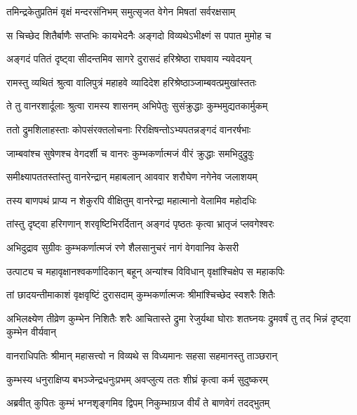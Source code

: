 \twolineshloka
{तमिन्द्रकेतुप्रतिमं वृक्षं मन्दरसंनिभम्}
{समुत्सृजत वेगेन मिषतां सर्वरक्षसाम्} %

\twolineshloka
{स चिच्छेद शितैर्बाणैः सप्तभिः कायभेदनैः}
{अङ्गदो विव्यथेऽभीक्ष्णं स पपात मुमोह च} %

\twolineshloka
{अङ्गदं पतितं दृष्ट्वा सीदन्तमिव सागरे}
{दुरासदं हरिश्रेष्ठा राघवाय न्यवेदयन्} %

\twolineshloka
{रामस्तु व्यथितं श्रुत्वा वालिपुत्रं महाहवे}
{व्यादिदेश हरिश्रेष्ठाञ्जाम्बवत्प्रमुखांस्ततः} %

\twolineshloka
{ते तु वानरशार्दूलाः श्रुत्वा रामस्य शासनम्}
{अभिपेतुः सुसंक्रुद्धाः कुम्भमुद्यतकार्मुकम्} %

\twolineshloka
{ततो द्रुमशिलाहस्ताः कोपसंरक्तलोचनाः}
{रिरक्षिषन्तोऽभ्यपतन्नङ्गदं वानरर्षभाः} %

\twolineshloka
{जाम्बवांश्च सुषेणश्च वेगदर्शी च वानरः}
{कुम्भकर्णात्मजं वीरं क्रुद्धाः समभिदुद्रुवुः} %

\twolineshloka
{समीक्ष्यापततस्तांस्तु वानरेन्द्रान् महाबलान्}
{आववार शरौघेण नगेनेव जलाशयम्} %

\twolineshloka
{तस्य बाणपथं प्राप्य न शेकुरपि वीक्षितुम्}
{वानरेन्द्रा महात्मानो वेलामिव महोदधिः} %

\twolineshloka
{तांस्तु दृष्ट्वा हरिगणान् शरवृष्टिभिरर्दितान्}
{अङ्गदं पृष्ठतः कृत्वा भ्रातृजं प्लवगेश्वरः} %

\twolineshloka
{अभिदुद्राव सुग्रीवः कुम्भकर्णात्मजं रणे}
{शैलसानुचरं नागं वेगवानिव केसरी} %

\twolineshloka
{उत्पाट्य च महावृक्षानश्वकर्णादिकान् बहून्}
{अन्यांश्च विविधान् वृक्षांश्चिक्षेप स महाकपिः} %

\twolineshloka
{तां छादयन्तीमाकाशं वृक्षवृष्टिं दुरासदाम्}
{कुम्भकर्णात्मजः श्रीमांश्चिच्छेद स्वशरैः शितैः} %

\threelineshloka
{अभिलक्ष्येण तीव्रेण कुम्भेन निशितैः शरैः}
{आचितास्ते द्रुमा रेजुर्यथा घोराः शतघ्नयः}
{द्रुमवर्षं तु तद् भिन्नं दृष्ट्वा कुम्भेन वीर्यवान्} %

\twolineshloka
{वानराधिपतिः श्रीमान् महासत्त्वो न विव्यथे}
{स विध्यमानः सहसा सहमानस्तु ताञ्छरान्} %

\twolineshloka
{कुम्भस्य धनुराक्षिप्य बभञ्जेन्द्रधनुःप्रभम्}
{अवप्लुत्य ततः शीघ्रं कृत्वा कर्म सुदुष्करम्} %

\twolineshloka
{अब्रवीत् कुपितः कुम्भं भग्नशृङ्गमिव द्विपम्}
{निकुम्भाग्रज वीर्यं ते बाणवेगं तदद्भुतम्} %

